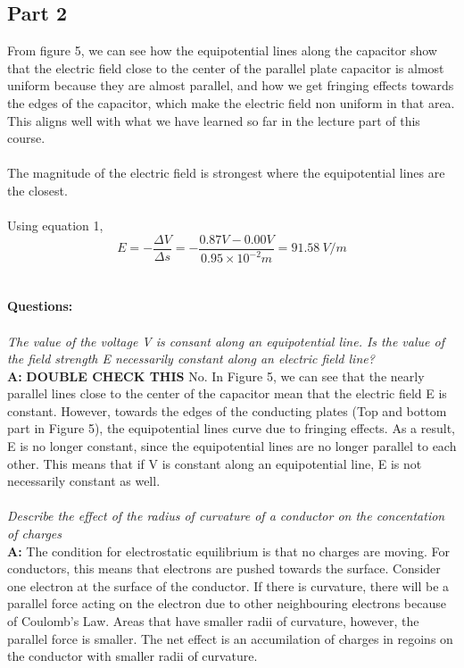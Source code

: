 \documentclass[letterpaper]{article}
\begin{document}
\subsection{Part 2}
From figure 5, we can see how the equipotential lines along the capacitor show that the
electric field close to the center of the parallel plate capacitor is almost uniform because they are almost parallel, and
how we get fringing effects towards the edges of the capacitor, which make the electric field non uniform
in that area. This aligns well with what we have learned so far in the lecture part of this course.
\\ \\
The magnitude of the electric field is strongest where the equipotential lines are the closest.\\
\\Using equation 1,
$$ E=-\frac{\Delta V}{\Delta s}= -\frac{0.87 V -0.00 V}{0.95\times 10^{-2} m} = 91.58 \:V/m $$
\\ \\
\textbf{Questions: }\\ \\
\textit{The value of the voltage V is consant along an equipotential line.
Is the value of the field strength E necessarily constant along an electric field line?}\\
\textbf{A:}
\textbf{DOUBLE CHECK THIS} No. In Figure 5, we can see that
the nearly parallel lines close to the center of the capacitor mean that the electric field E is constant.
However, towards the edges of the conducting plates (Top and bottom part in Figure 5), the equipotential lines
curve due to fringing effects. As a result, E is no longer constant, since the equipotential lines
are no longer parallel to each other. This means that if V is constant along an equipotential line,
E is not necessarily constant as well.\\ \\
\textit{Describe the effect of the radius of curvature of a conductor on the concentation of charges}\\
\textbf{A:}
The condition for electrostatic equilibrium is that no charges are moving. For conductors, this means
that electrons are pushed towards the surface. Consider one electron at the surface of the conductor.
If there is curvature, there will be a parallel force acting on the electron due to other neighbouring
electrons because of Coulomb's Law. Areas that have smaller radii of curvature, however, the
parallel force is smaller. The net effect is an accumilation of charges in regoins on the conductor with
smaller radii of curvature.
\end{document}
